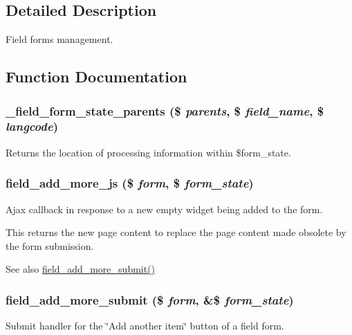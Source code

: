 \subsection{Detailed Description}
Field forms management. 

\subsection{Function Documentation}
\hypertarget{field_8form_8inc_aaf5ced1bff5c1580e84b9a7cfbf961c5}{
\subsubsection[{\_\-field\_\-form\_\-state\_\-parents}]{\setlength{\rightskip}{0pt plus 5cm}\_\-field\_\-form\_\-state\_\-parents (\$ {\em parents}, \/  \$ {\em field\_\-name}, \/  \$ {\em langcode})}}
\label{field_8form_8inc_aaf5ced1bff5c1580e84b9a7cfbf961c5}
Returns the location of processing information within \$form\_\-state. \hypertarget{field_8form_8inc_a8e5c072d17551aa6112f4ea27328b9d6}{
\subsubsection[{field\_\-add\_\-more\_\-js}]{\setlength{\rightskip}{0pt plus 5cm}field\_\-add\_\-more\_\-js (\$ {\em form}, \/  \$ {\em form\_\-state})}}
\label{field_8form_8inc_a8e5c072d17551aa6112f4ea27328b9d6}
Ajax callback in response to a new empty widget being added to the form.

This returns the new page content to replace the page content made obsolete by the form submission.

\begin{DoxySeeAlso}{See also}
\hyperlink{field_8form_8inc_a39c4e68fe7eac6f151f7c140854d50dc}{field\_\-add\_\-more\_\-submit()} 
\end{DoxySeeAlso}
\hypertarget{field_8form_8inc_a39c4e68fe7eac6f151f7c140854d50dc}{
\subsubsection[{field\_\-add\_\-more\_\-submit}]{\setlength{\rightskip}{0pt plus 5cm}field\_\-add\_\-more\_\-submit (\$ {\em form}, \/  \&\$ {\em form\_\-state})}}
\label{field_8form_8inc_a39c4e68fe7eac6f151f7c140854d50dc}
Submit handler for the \char`\"{}Add another item\char`\"{} button of a field form.

